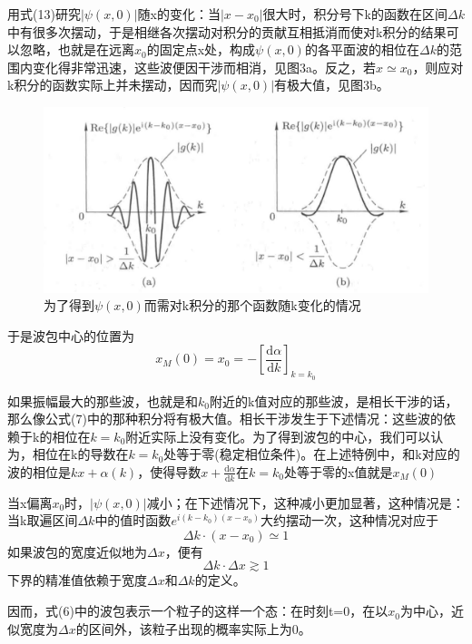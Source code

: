 \documentclass[]{article}
\begin{document}
用式(13)研究$|\psi(x,0)|$随x的变化：当$|x-x_0|$很大时，积分号下k的函数在区间$\Delta k$中有很多次摆动，于是相继各次摆动对积分的贡献互相抵消而使对k积分的结果可以忽略，也就是在远离$x_0$的固定点x处，构成$\psi(x,0)$的各平面波的相位在$\Delta k$的范围内变化得非常迅速，这些波便因干涉而相消，见图3a。反之，若$x\simeq x_0$，则应对k积分的函数实际上并未摆动，因而究$|\psi(x,0)|$有极大值，见图3b。
\begin{figure}[H]
	\centering
	\includegraphics[scale=0.3]{3.png}
	\caption{为了得到$\psi(x,0)$而需对k积分的那个函数随k变化的情况}
	\label{Figure 3}
\end{figure}

于是波包中心的位置为
\begin{equation}
	x_M(0)=x_0=-\left[ \dfrac{\mathrm{d}\alpha}{\mathrm{d}k}\right] _{k=k_0}
\end{equation}

如果振幅最大的那些波，也就是和$k_0$附近的k值对应的那些波，是相长干涉的话，那么像公式(7)中的那种积分将有极大值。相长干涉发生于下述情况：这些波的依赖于k的相位在$k=k_0$附近实际上没有变化。为了得到波包的中心，我们可以认为，相位在k的导数在$k=k_0$处等于零(稳定相位条件)。在上述特例中，和k对应的波的相位是$kx+\alpha(k)$，使得导数$x+\frac{\mathrm{d}\alpha}{\mathrm{d}k}$在$k=k_0$处等于零的x值就是$x_M(0)$\par 
当x偏离$x_0$时，$|\psi(x,0)|$减小；在下述情况下，这种减小更加显著，这种情况是：当k取遍区间$\Delta k$中的值时函数$e^{i(k-k_0)(x-x_0)}$大约摆动一次，这种情况对应于
\begin{equation}
	\Delta k\cdot(x-x_0)\simeq 1
\end{equation}
如果波包的宽度近似地为$\Delta x$，便有
\begin{equation}
	\Delta k\cdot\Delta x\gtrsim 1
\end{equation}
下界的精准值依赖于宽度$\Delta x$和$\Delta k$的定义。\par 
因而，式(6)中的波包表示一个粒子的这样一个态：在时刻t=0，在以$x_0$为中心，近似宽度为$\Delta x$的区间外，该粒子出现的概率实际上为0。
\end{document}
